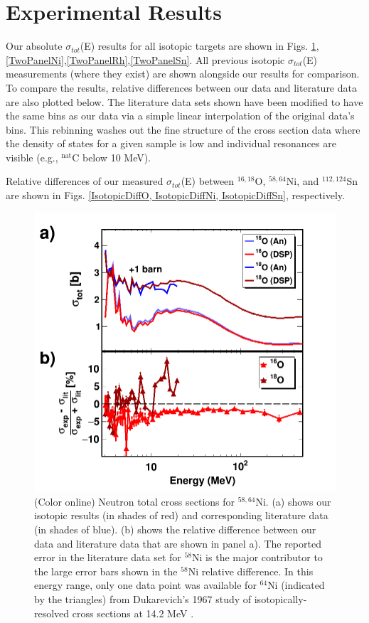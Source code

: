 \documentclass[twocolumn,secnumarabic,amssymb, nobibnotes, aps, prl,
superscriptaddress, nobalancelastpage]{revtex4}
\newcommand{\totEs}{\ensuremath{\sigma_{tot}}(E)\,\,}
\begin{document}
\section{Experimental Results}

Our absolute \totEs results for all isotopic targets are shown in Figs.
\ref{TwoPanelO},\ref{TwoPanelNi},\ref{TwoPanelRh},\ref{TwoPanelSn}. All previous isotopic \totEs
measurements (where they exist) are shown alongside our results for comparison.
To compare the results, relative differences between our data and literature
data are also plotted below. The literature
data sets shown have been modified to have the same bins as our data via a simple
linear interpolation of the original data's bins. This rebinning
washes out the fine structure of the cross section data where the density of states
for a given sample is low and individual resonances are visible
(e.g., $^{\text{nat}}$C below 10 MeV).

Relative differences of our measured \totEs between $^{16,18}$O, $^{58,64}$Ni, and
$^{112,124}$Sn are shown in Figs. \ref{IsotopicDiffO, IsotopicDiffNi, 
IsotopicDiffSn}, respectively. 
\begin{figure}
    \includegraphics[scale=0.35]{figures/TwoPanelO.png}
    \caption{(Color online) Neutron total cross sections for $^{58,64}$Ni.
        (a) shows our isotopic results (in shades of red) and
        corresponding literature data \cite{Perey1993, Dukarevich1967} (in
        shades of blue). (b) shows the relative difference between our data
        and literature data that are shown in panel a). The reported error in
        the literature data set for $^{58}$Ni is the major contributor to the
        large error bars shown in the $^{58}$Ni relative difference. In this
        energy range, only one data point was available for $^{64}$Ni (indicated
        by the triangles) from Dukarevich's 1967 study of isotopically-resolved cross
        sections at 14.2 MeV \cite{Dukarevich1967}.
    }
    \label{TwoPanelO}
\end{figure}
\end{document}
